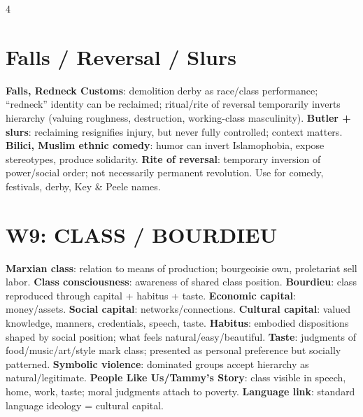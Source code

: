 \documentclass[10pt,landscape]{article}
\newcommand{\kw}[1]{\textbf{#1}}
\begin{document}
\begin{multicols*}{4}
\section*{Falls / Reversal / Slurs}
\kw{Falls, Redneck Customs}: demolition derby as race/class performance; ``redneck'' identity can be reclaimed; ritual/rite of reversal temporarily inverts hierarchy (valuing roughness, destruction, working-class masculinity). \kw{Butler + slurs}: reclaiming resignifies injury, but never fully controlled; context matters. \kw{Bilici, Muslim ethnic comedy}: humor can invert Islamophobia, expose stereotypes, produce solidarity. \kw{Rite of reversal}: temporary inversion of power/social order; not necessarily permanent revolution. Use for comedy, festivals, derby, Key \& Peele names.

\section*{W9: CLASS / BOURDIEU}
\kw{Marxian class}: relation to means of production; bourgeoisie own, proletariat sell labor. \kw{Class consciousness}: awareness of shared class position. \kw{Bourdieu}: class reproduced through capital + habitus + taste. \kw{Economic capital}: money/assets. \kw{Social capital}: networks/connections. \kw{Cultural capital}: valued knowledge, manners, credentials, speech, taste. \kw{Habitus}: embodied dispositions shaped by social position; what feels natural/easy/beautiful. \kw{Taste}: judgments of food/music/art/style mark class; presented as personal preference but socially patterned. \kw{Symbolic violence}: dominated groups accept hierarchy as natural/legitimate. \kw{People Like Us/Tammy's Story}: class visible in speech, home, work, taste; moral judgments attach to poverty. \kw{Language link}: standard language ideology = cultural capital.


\end{multicols*}
\end{document}
